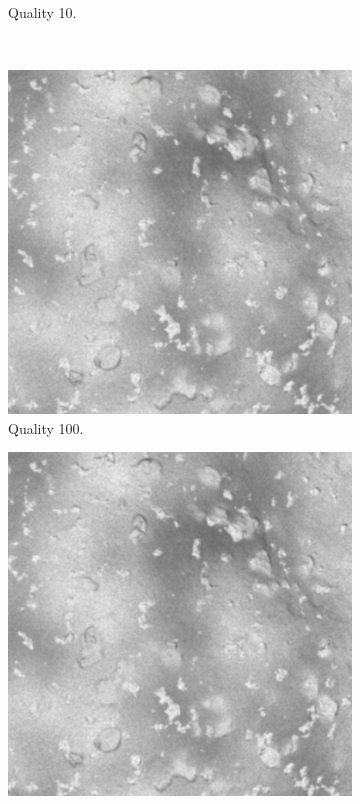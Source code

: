 \begin{figure}[htb]
\begin{subfigure}[b]{0.47\textwidth}
            \caption{Quality 10.}
            \label{fig:img_quality_10}
        \end{subfigure}
        \\
        \begin{subfigure}[b]{0.47\textwidth}
            \centering
            \includegraphics[width=\textwidth]{doc/thesis/0_figures/quality_compare/jp2_100_center.png}
            \caption{Quality 100.}
            \label{fig:img_quality_100}
        \end{subfigure}
        \begin{subfigure}[b]{0.47\textwidth}
            \centering
            \includegraphics[width=\textwidth]{doc/thesis/0_figures/quality_compare/jp2_1000_center.png}

\end{subfigure}
\end{figure}
